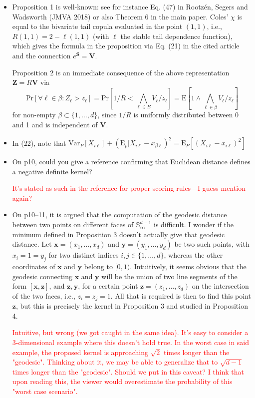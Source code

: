 \documentclass[10pt]{article}
\newcommand{\peter}[1]{\textcolor{red}{#1}}  %
\begin{document}
\begin{itemize}
    \item Proposition 1 is well-known: see for instance Eq. (47) in Rootzén, Segers and Wadsworth (JMVA 2018) or also Theorem 6 in the main paper. Coles’ $\chi$ is equal to the bivariate tail copula evaluated in the point $(1 , 1)$, i.e., $R(1,1) = 2-\ell(1 , 1)$ (with $\ell$ the stable tail dependence function), which gives the formula in the proposition via Eq. (21) in the cited article and the connection $e^{\bm{S}} = \bm{V}$.
    
    Proposition 2 is an immediate consequence of the above representation $\bm{Z} = R\bm{V}$  via \[\text{Pr}[\forall\ell\in \beta:Z_{\ell}>z_{\ell}] = \text{Pr}\left[1/R < \bigwedge_{\ell \in B}V_{\ell}/z_{\ell}\right] = \text{E}\left[1\wedge\bigwedge_{\ell \in \beta}V_{\ell}/z_{\ell}\right]\] for non-empty $\beta\subset\lbrace 1,\ldots, d\rbrace$, since $1 /R$ is uniformly distributed between 0 and 1 and is independent of $\bm{V}$.
    
    \item  In (22), note that $\text{Var}_P[X_{i\ell}] + (\text{E}_p[X_{i\ell} - x_{\beta\ell})^2 = \text{E}_P[(X_{i\ell} - x_{i\ell})^2]$
    \item On p10, could you give a reference confirming that Euclidean distance defines a negative definite kernel?
    
    \peter{It's stated as such in the reference for proper scoring rules---I guess mention again?}
    
    \item On p10–11, it is argued that the computation of the geodesic distance between two points on different faces of $\mathbb{S}_{\infty}^{d-1}$ is difficult. I wonder if the minimum defined in Proposition 3 doesn’t actually give that geodesic distance. Let $\bm{x} = (x_1,\ldots,x_d)$ and $\bm{y} = (y_1,\ldots,y_d)$ be two such points, with $x_i = 1 = y_j$ for two distinct indices $i,j \in \lbrace1,\ldots,d\rbrace$, whereas the other coordinates of $\bm{x}$ and $\bm{y}$ belong to $[0 , 1)$. Intuitively, it seems obvious that the geodesic connecting $\bm{x}$ and $\bm{y}$ will be the union of two line segments of the form $[\bm{x},\bm{z}]$, and $\bm{z},\bm{y}$, for a certain point $\bm{z} = (z_1,\ldots,z_d)$ on the intersection of the two faces, i.e., $z_i = z_j = 1$.  All that is required is then to find this point $\bm{z}$, 
    but this is precisely the kernel in Proposition 3 and studied in Proposition 4.

    \peter{Intuitive, but wrong (we got caught in the same idea).  It's easy to consider a 3-dimensional example where this doesn't hold true. In the worst case in said example, the proposed kernel is approaching $\sqrt{2}$ times longer than the "geodesic".  Thinking about it, we may be able to generalize that to $\sqrt{d-1}$ times longer than the "geodesic".  Should we put in this caveat?  I think that upon reading this, the viewer would overestimate the probability of this "worst case scenario".}
    

\end{itemize}
\end{document}
